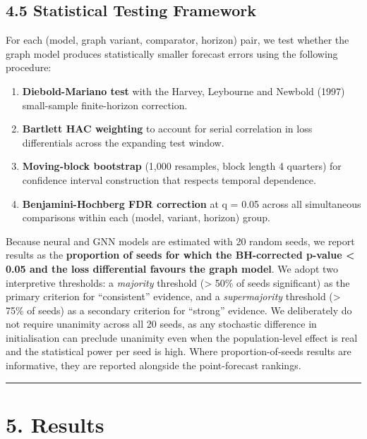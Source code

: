 \documentclass[
]{article}
\providecommand{\tightlist}{%
  \setlength{\itemsep}{0pt}\setlength{\parskip}{0pt}}
\begin{document}
\subsection{4.5 Statistical Testing
Framework}\label{statistical-testing-framework}

For each (model, graph variant, comparator, horizon) pair, we test
whether the graph model produces statistically smaller forecast errors
using the following procedure:

\begin{enumerate}
\def\labelenumi{\arabic{enumi}.}
\tightlist
\item
  \textbf{Diebold-Mariano test} with the Harvey, Leybourne and Newbold
  (1997) small-sample finite-horizon correction.
\item
  \textbf{Bartlett HAC weighting} to account for serial correlation in
  loss differentials across the expanding test window.
\item
  \textbf{Moving-block bootstrap} (1,000 resamples, block length 4
  quarters) for confidence interval construction that respects temporal
  dependence.
\item
  \textbf{Benjamini-Hochberg FDR correction} at q = 0.05 across all
  simultaneous comparisons within each (model, variant, horizon) group.
\end{enumerate}

Because neural and GNN models are estimated with 20 random seeds, we
report results as the \textbf{proportion of seeds for which the
BH-corrected p-value \textless{} 0.05 and the loss differential favours
the graph model}. We adopt two interpretive thresholds: a
\emph{majority} threshold (\textgreater{} 50\% of seeds significant) as
the primary criterion for ``consistent'' evidence, and a
\emph{supermajority} threshold (\textgreater{} 75\% of seeds) as a
secondary criterion for ``strong'' evidence. We deliberately do not
require unanimity across all 20 seeds, as any stochastic difference in
initialisation can preclude unanimity even when the population-level
effect is real and the statistical power per seed is high. Where
proportion-of-seeds results are informative, they are reported alongside
the point-forecast rankings.

\begin{center}\rule{0.5\linewidth}{0.5pt}\end{center}

\section{5. Results}\label{results}
\end{document}
